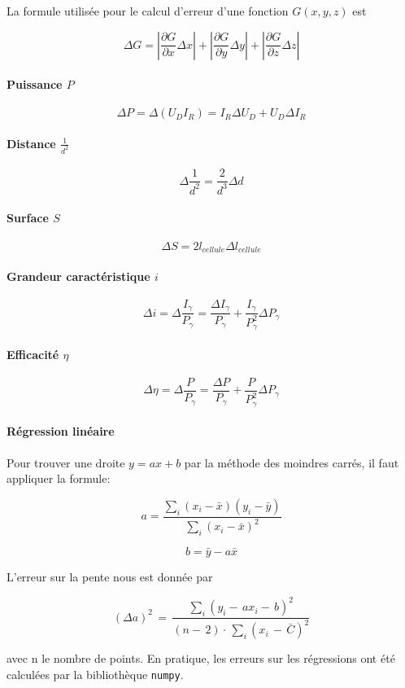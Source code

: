 La formule utilisée pour le calcul d'erreur d'une fonction \(G(x,y,z)\) est \cite{erreursmesure}

\begin{equation*}
    \Delta G = \left|\frac{\partial{G}}{\partial{x}}\Delta x\right| + \left|\frac{\partial{G}}{\partial{y}}\Delta y\right| + \left|\frac{\partial{G}}{\partial{z}}\Delta z\right|
\end{equation*}

\paragraph*{Puissance \(P\)}
\[ \Delta P = \Delta (U_D I_R) = I_R \Delta U_D + U_D \Delta I_R \]

\paragraph*{Distance \(\frac{1}{d^2}\)}
\[ \Delta \frac{1}{d^2} = \frac{2}{d^3}\Delta d\]

\paragraph*{Surface \(S\)}
\[ \Delta S = 2 l_{cellule} \Delta l_{cellule} \]

\paragraph*{Grandeur caractéristique \(i\)}
\[ \Delta i = \Delta \frac{I_\gamma}{P_\gamma} = \frac{\Delta I_\gamma}{P_\gamma} + \frac{I_\gamma}{P_\gamma^2} \Delta P_\gamma \]

\paragraph*{Efficacité \(\eta\)}
\[ \Delta \eta = \Delta \frac{P}{P_\gamma} = \frac{\Delta P}{P_\gamma} + \frac{P}{P_\gamma^2} \Delta P_\gamma\]

\paragraph*{Régression linéaire}
Pour trouver une droite \(y = ax+b\) par la méthode des moindres carrés,
il faut appliquer la formule:

\[ a=\frac{\sum_{i}(x_{i}-\bar{x})(y_{i}-\bar{y})}{\sum_{i}(x_{i}-\bar{x})^{2}} \]

\[ b = \bar{y} - a\bar{x}\]

L'erreur sur la pente nous est donnée par

\[ \left(\Delta{a}\right)^{2}\,=\,{\frac{\sum_{i}(y_{i}-\,a{x}_{i}-\,b)^{2}}{\left(n-\,2\right)\cdot\,\sum_{i}({x}_{i}\,-\,\bar{C})^{2}}} \]

avec n le nombre de points. En pratique, les erreurs sur les régressions ont été calculées par la bibliothèque \texttt{numpy}.

